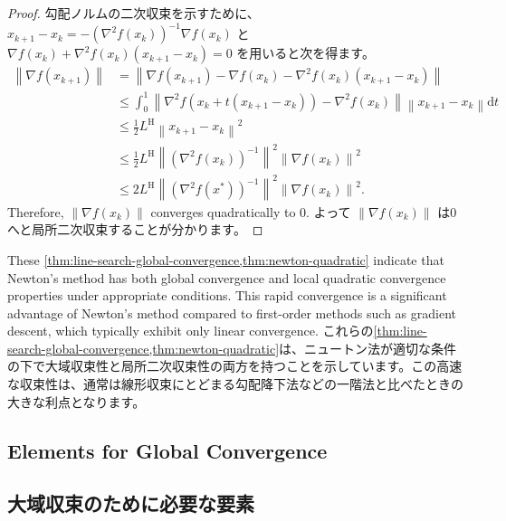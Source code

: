 \documentclass[0_main]{subfiles}
\begin{document}
\begin{proof}
        勾配ノルムの二次収束を示すために、$x_{k+1}-x_k=-\left(\nabla^2 f(x_k)\right)^{-1}\nabla f(x_k)$ と
        $\nabla f(x_k)+\nabla^2 f(x_k)(x_{k+1}-x_k)=0$ を用いると次を得ます。
    \fi
    \begin{align*}
        \left\lVert \nabla f(x_{k+1}) \right\rVert
         & = \left\lVert \nabla f(x_{k+1})-\nabla f(x_k)-\nabla^2 f(x_k)(x_{k+1}-x_k) \right\rVert                                              \\
         & \le \int_0^1 \left\lVert \nabla^2 f(x_k+t (x_{k+1}-x_k))-\nabla^2 f(x_k) \right\rVert\left\lVert x_{k+1}-x_k \right\rVert\mathrm{d}t \\
         & \le \frac{1}{2}L^{\mathrm{H}}\left\lVert x_{k+1}-x_k \right\rVert^2                                                                  \\
         & \le \frac{1}{2}L^{\mathrm{H}}\left\lVert \left(\nabla^2 f(x_k)\right)^{-1} \right\rVert^2\left\lVert \nabla f(x_k) \right\rVert^2    \\
         & \le 2 L^{\mathrm{H}} \left\lVert \left(\nabla^2 f(x^*)\right)^{-1} \right\rVert^2\left\lVert \nabla f(x_k) \right\rVert^2.
    \end{align*}
    \ifEn
        Therefore, $\left\lVert \nabla f(x_k) \right\rVert$ converges quadratically to 0.
    \else
        よって $\left\lVert \nabla f(x_k) \right\rVert$ は0へと局所二次収束することが分かります。
    \fi
    \myQED
\end{proof}
\ifEn
    These \cref{thm:line-search-global-convergence,thm:newton-quadratic} indicate that Newton's method has both global convergence and local quadratic convergence properties under appropriate conditions. This rapid convergence is a significant advantage of Newton's method compared to first-order methods such as gradient descent, which typically exhibit only linear convergence.
\else
    これらの\cref{thm:line-search-global-convergence,thm:newton-quadratic}は、ニュートン法が適切な条件の下で大域収束性と局所二次収束性の両方を持つことを示しています。この高速な収束性は、通常は線形収束にとどまる勾配降下法などの一階法と比べたときの大きな利点となります。
\fi

\ifEn
    \subsection{Elements for Global Convergence}
\else
    \subsection{大域収束のために必要な要素}
\fi
\end{document}
